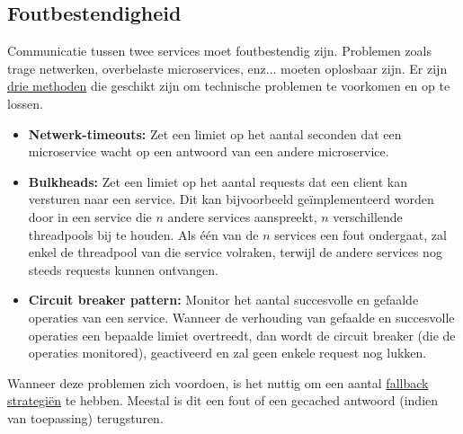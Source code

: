 	\subsection{Foutbestendigheid}
	Communicatie tussen twee services moet foutbestendig zijn. Problemen zoals trage netwerken, overbelaste microservices, enz... moeten oplosbaar zijn. Er zijn \uline{drie methoden} die geschikt zijn om technische problemen te voorkomen en op te lossen.
	\begin{itemize}
		\item \textbf{Netwerk-timeouts:} Zet een limiet op het aantal seconden dat een microservice wacht op een antwoord van een andere microservice.
		\item \textbf{Bulkheads:} Zet een limiet op het aantal requests dat een client kan versturen naar een service. Dit kan bijvoorbeeld geïmplementeerd worden door in een service die $n$ andere services aanspreekt, $n$ verschillende threadpools bij te houden. Als één van de $n$ services een fout ondergaat, zal enkel de threadpool van die service volraken, terwijl de andere services nog steeds requests kunnen ontvangen.
		\item \textbf{Circuit breaker pattern:} Monitor het aantal succesvolle en gefaalde operaties van een service. Wanneer de verhouding van gefaalde en succesvolle operaties een bepaalde limiet overtreedt, dan wordt de circuit breaker (die de operaties monitored), geactiveerd en zal geen enkele request nog lukken.
	\end{itemize}
	Wanneer deze problemen zich voordoen, is het nuttig om een aantal \uline{fallback strategiën} te hebben. Meestal is dit een fout of een gecached antwoord (indien van toepassing) terugsturen.
